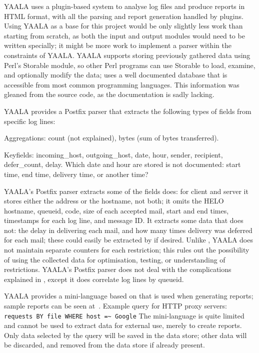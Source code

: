 YAALA uses a plugin-based system to analyse log files and produce reports
in HTML format, with all the parsing and report generation handled by
plugins.  Using YAALA as a base for this project would be only slightly
less work than starting from scratch, as both the input and output modules
would need to be written specially; it might be more work to implement a
parser within the constraints of YAALA\@.  YAALA supports storing
previously gathered data using Perl's Storable module, so other Perl
programs can use Storable to load, examine, and optionally modify the data;
\parsername{} uses a well documented database that is accessible from most
common programming languages.  This information was gleaned from the source
code, as the documentation is sadly lacking.

YAALA provides a Postfix parser that extracts the following types of fields
from specific log lines:

\begin{eqlist}

    \item [Aggregations:] count (not explained), bytes (sum of bytes
        transferred).

    \item [Keyfields:] incoming\_host, outgoing\_host, date, hour, sender,
        recipient, defer\_count, delay.  Which date and hour are stored is
        not documented: start time, end time, delivery time, or another
        time?

\end{eqlist}

\noindent{}YAALA's Postfix parser extracts some of the fields \parsername{}
does: for client and server it stores either the  address or
the hostname, not both; it omits the HELO hostname, queueid, 
code, size of each accepted mail, start and end times, timestamps for each
log line, and message ID\@.  It extracts some data that \parsername{} does
not: the delay in delivering each mail, and how many times delivery was
deferred for each mail; these could easily be extracted by \parsername{} if
desired.  Unlike \parsername{}, YAALA does not maintain separate counters
for each restriction; this rules out the possibility of using the collected
data for optimisation, testing, or understanding of restrictions.  YAALA's
Postfix parser does not deal with the complications explained in
, except it does correlate log lines by queueid.

YAALA provides a mini-language based on  that is used when
generating reports; sample reports can be seen
at~.  Example
query for HTTP proxy servers: \newline{} \tab{} \texttt{requests BY file
WHERE host =\~{} Google} \newline{} The mini-language is quite limited and
cannot be used to extract data for external use, merely to create reports.
Only data selected by the query will be saved in the data store; other data
will be discarded, and removed from the data store if already present.


